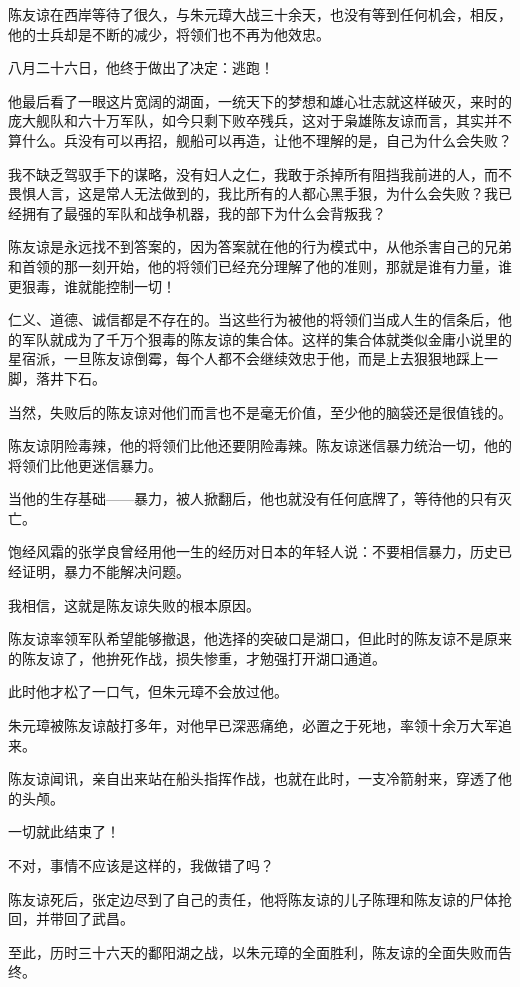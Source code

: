 \begin{multicols}{\theparacolNo}
		陈友谅在西岸等待了很久，与朱元璋大战三十余天，也没有等到任何机会，相反，他的士兵却是不断的减少，将领们也不再为他效忠。

		八月二十六日，他终于做出了决定：逃跑！

		他最后看了一眼这片宽阔的湖面，一统天下的梦想和雄心壮志就这样破灭，来时的庞大舰队和六十万军队，如今只剩下败卒残兵，这对于枭雄陈友谅而言，其实并不算什么。兵没有可以再招，舰船可以再造，让他不理解的是，自己为什么会失败？

		我不缺乏驾驭手下的谋略，没有妇人之仁，我敢于杀掉所有阻挡我前进的人，而不畏惧人言，这是常人无法做到的，我比所有的人都心黑手狠，为什么会失败？我已经拥有了最强的军队和战争机器，我的部下为什么会背叛我？

		陈友谅是永远找不到答案的，因为答案就在他的行为模式中，从他杀害自己的兄弟和首领的那一刻开始，他的将领们已经充分理解了他的准则，那就是谁有力量，谁更狠毒，谁就能控制一切！

		仁义、道德、诚信都是不存在的。当这些行为被他的将领们当成人生的信条后，他的军队就成为了千万个狠毒的陈友谅的集合体。这样的集合体就类似金庸小说里的星宿派，一旦陈友谅倒霉，每个人都不会继续效忠于他，而是上去狠狠地踩上一脚，落井下石。

		当然，失败后的陈友谅对他们而言也不是毫无价值，至少他的脑袋还是很值钱的。

		陈友谅阴险毒辣，他的将领们比他还要阴险毒辣。陈友谅迷信暴力统治一切，他的将领们比他更迷信暴力。

		当他的生存基础——暴力，被人掀翻后，他也就没有任何底牌了，等待他的只有灭亡。

		饱经风霜的张学良曾经用他一生的经历对日本的年轻人说：不要相信暴力，历史已经证明，暴力不能解决问题。

		我相信，这就是陈友谅失败的根本原因。

		陈友谅率领军队希望能够撤退，他选择的突破口是湖口，但此时的陈友谅不是原来的陈友谅了，他拚死作战，损失惨重，才勉强打开湖口通道。

		此时他才松了一口气，但朱元璋不会放过他。

		朱元璋被陈友谅敲打多年，对他早已深恶痛绝，必置之于死地，率领十余万大军追来。

		陈友谅闻讯，亲自出来站在船头指挥作战，也就在此时，一支冷箭射来，穿透了他的头颅。

		一切就此结束了！

		不对，事情不应该是这样的，我做错了吗？

		陈友谅死后，张定边尽到了自己的责任，他将陈友谅的儿子陈理和陈友谅的尸体抢回，并带回了武昌。

		至此，历时三十六天的鄱阳湖之战，以朱元璋的全面胜利，陈友谅的全面失败而告终。


\end{multicols}
